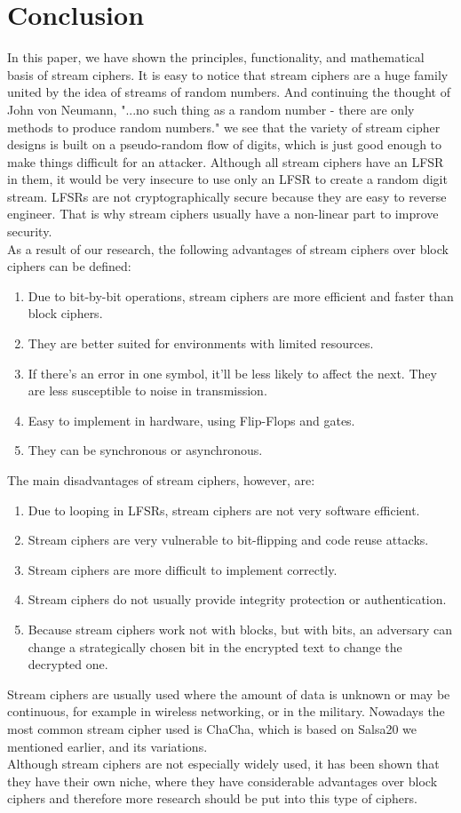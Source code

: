 \section{Conclusion}
In this paper, we have shown the principles, functionality, and mathematical basis of stream ciphers. It is easy to notice that stream ciphers are a huge family united by the idea of streams of random numbers. And continuing the thought of John von Neumann, "...no such thing as a random number - there are only methods to produce random numbers." \cite[p.~36]{vonNeumann1951} we see that the variety of stream cipher designs is built on a pseudo-random flow of digits, which is just good enough to make things difficult for an attacker. Although all stream ciphers have an LFSR in them, it would be very insecure to use only an LFSR to create a random digit stream. LFSRs are not cryptographically secure because they are easy to reverse engineer. That is why stream ciphers usually have a non-linear part to improve security.\\
As a result of our research, the following advantages of stream ciphers over block ciphers can be defined:
\begin{enumerate}
	\setlength\itemsep{0.1em}
	\item Due to bit-by-bit operations, stream ciphers are more efficient and faster than block ciphers.
	\item They are better suited for environments with limited resources. 
	\item If there’s an error in one symbol, it’ll be less likely to affect the next. They are less susceptible to noise in transmission.
	\item Easy to implement in hardware, using Flip-Flops and gates.
	\item They can be synchronous or asynchronous.
\end{enumerate}
The main disadvantages of stream ciphers, however, are:
\begin{enumerate}
	\setlength\itemsep{0.1em}
	\item Due to looping in LFSRs, stream ciphers are not very software efficient.
	\item Stream ciphers are very vulnerable to bit-flipping and code reuse attacks. 
	\item Stream ciphers are more difficult to implement correctly.
	\item Stream ciphers do not usually provide integrity protection or authentication.
	\item Because stream ciphers work not with blocks, but with bits, an adversary can change a strategically chosen bit in the encrypted text to change the decrypted one.
\end{enumerate}

Stream ciphers are usually used where the amount of data is unknown or may be continuous, for example in wireless networking, or in the military. Nowadays the most common stream cipher used is ChaCha, which is based on Salsa20 we mentioned earlier, and its variations. \\
Although stream ciphers are not especially widely used, it has been shown that they have their own niche, where they have considerable advantages over block ciphers and therefore more research should be put into this type of ciphers.
\clearpage